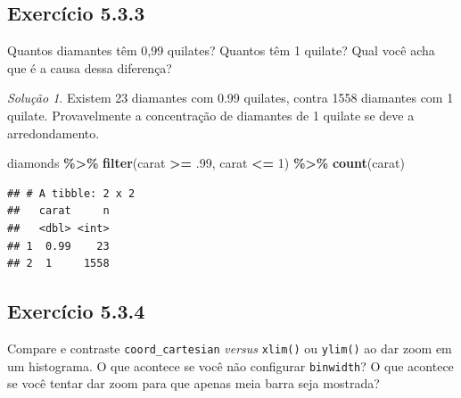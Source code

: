 \documentclass[
]{latex/krantz}
\newenvironment{Shaded}{\begin{snugshade}}{\end{snugshade}}
\newcommand{\DecValTok}[1]{\textcolor[rgb]{0.00,0.00,0.81}{#1}}
\newcommand{\FunctionTok}[1]{\textcolor[rgb]{0.13,0.29,0.53}{\textbf{#1}}}
\newcommand{\NormalTok}[1]{#1}
\newcommand{\SpecialCharTok}[1]{\textcolor[rgb]{0.81,0.36,0.00}{\textbf{#1}}}
\theoremstyle{definition}
\theoremstyle{definition}
\theoremstyle{definition}
\theoremstyle{definition}
\theoremstyle{remark}
\newtheorem*{solution}{Solução}
\begin{document}
\hypertarget{exr5-3-3}{%
\subsection*{Exercício 5.3.3}\label{exr5-3-3}}

Quantos diamantes têm 0,99 quilates? Quantos têm 1 quilate? Qual você acha que é a causa dessa diferença?

\begin{solution}

Existem 23 diamantes com 0.99 quilates, contra 1558 diamantes com 1 quilate. Provavelmente a concentração de diamantes de 1 quilate se deve a arredondamento.

\begin{Shaded}
\begin{Highlighting}[]
\NormalTok{diamonds }\SpecialCharTok{\%\textgreater{}\%}
    \FunctionTok{filter}\NormalTok{(carat }\SpecialCharTok{\textgreater{}=}\NormalTok{ .}\DecValTok{99}\NormalTok{, carat }\SpecialCharTok{\textless{}=} \DecValTok{1}\NormalTok{) }\SpecialCharTok{\%\textgreater{}\%}
    \FunctionTok{count}\NormalTok{(carat)}
\end{Highlighting}
\end{Shaded}

\begin{verbatim}
## # A tibble: 2 x 2
##   carat     n
##   <dbl> <int>
## 1  0.99    23
## 2  1     1558
\end{verbatim}

\end{solution}

\hypertarget{exr5-3-4}{%
\subsection*{Exercício 5.3.4}\label{exr5-3-4}}

Compare e contraste \texttt{coord\_cartesian} \emph{versus} \texttt{xlim()} ou \texttt{ylim()} ao dar zoom em um histograma. O que acontece se você não configurar \texttt{binwidth}? O que acontece se você tentar dar zoom para que apenas meia barra seja mostrada?
\end{document}
